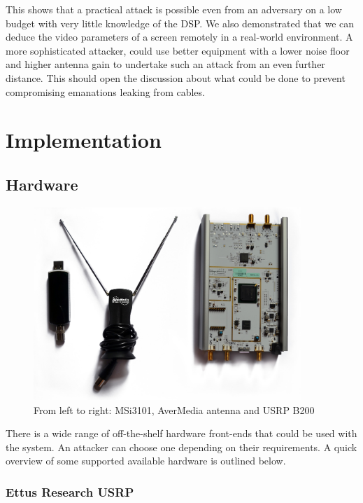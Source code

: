 \documentclass[a4paper,12pt,twoside,openright]{report}
\begin{document}
This shows that a practical attack is possible even from an adversary on a low budget with very little knowledge of the DSP. We also demonstrated that we can deduce the video parameters of a screen remotely in a real-world environment. A more sophisticated attacker, could use better equipment with a lower noise floor and higher antenna gain to undertake such an attack from an even further distance. This should open the discussion about what could be done to prevent compromising emanations leaking from cables.

\chapter{Implementation} 
\label{chap:implementation}

\section{Hardware}
\label{sec:hw} 

\begin{figure}[h!]
 
  \centering
    \includegraphics[width=0.9\textwidth]{equipment}
    \caption{From left to right: MSi3101, AverMedia antenna and USRP B200}
\end{figure}

There is a wide range of off-the-shelf hardware front-ends that could be used with the system. An attacker can choose one depending on their requirements. A quick overview of some supported available hardware is outlined below.

\subsection{Ettus Research USRP}
\end{document}
